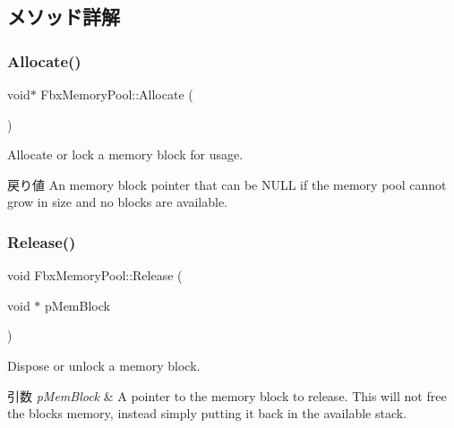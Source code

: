 \subsection{メソッド詳解}
\mbox{\label{class_fbx_memory_pool_aeccd6cbfc4f43a28fa16744a52ea877a}} 
\subsubsection{\texorpdfstring{Allocate()}{Allocate()}}
{\footnotesize\ttfamily void$\ast$ Fbx\+Memory\+Pool\+::\+Allocate (\begin{DoxyParamCaption}{ }\end{DoxyParamCaption})}

Allocate or lock a memory block for usage. \begin{DoxyReturn}{戻り値}
An memory block pointer that can be N\+U\+LL if the memory pool cannot grow in size and no blocks are available. 
\end{DoxyReturn}
\mbox{\label{class_fbx_memory_pool_adcac349666eea1d48455cfed673e4144}} 
\subsubsection{\texorpdfstring{Release()}{Release()}}
{\footnotesize\ttfamily void Fbx\+Memory\+Pool\+::\+Release (\begin{DoxyParamCaption}\item[{void $\ast$}]{p\+Mem\+Block }\end{DoxyParamCaption})}

Dispose or unlock a memory block. 
\begin{DoxyParams}{引数}
{\em p\+Mem\+Block} & A pointer to the memory block to release. This will not free the block\textquotesingle{}s memory, instead simply putting it back in the available stack. \\
\hline
\end{DoxyParams}
\mbox{\label{class_fbx_memory_pool_a9bd2739def7e1af783a5b97b83c3e8ff}} 
